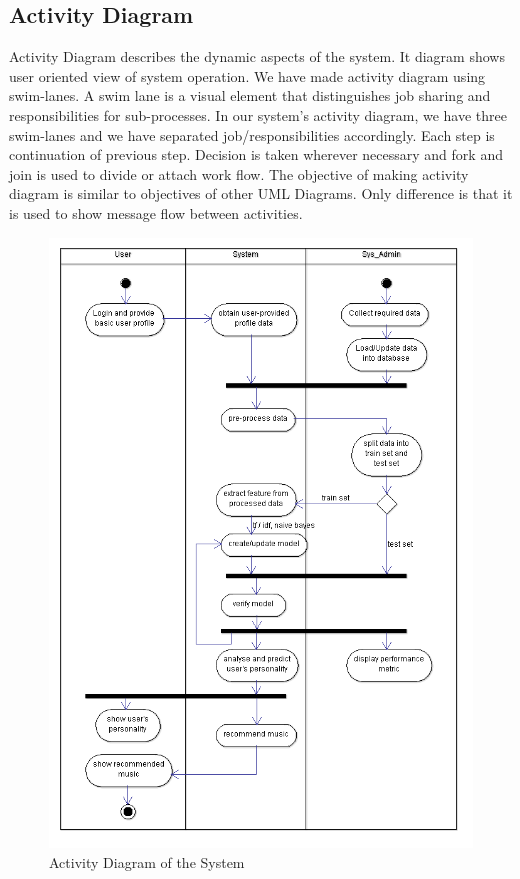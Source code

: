 \subsection{Activity Diagram}
Activity Diagram describes the dynamic aspects of the system. It diagram shows user oriented view of system operation. We have made activity diagram using swim-lanes. A swim lane is a visual element that distinguishes job sharing and responsibilities for sub-processes. In our system's activity diagram, we have three swim-lanes and we have separated job/responsibilities accordingly. Each step is continuation of previous step. Decision is taken wherever necessary and fork and join is used to divide or attach work flow. The objective of making activity diagram is similar to objectives of other UML Diagrams. Only difference is that it is used to show message flow between activities.
\newpage
\begin{figure}[!ht]
\centering
\includegraphics[width = 12 cm]{fig/new/activity.png}
\caption{Activity Diagram of the System}
\label{fig:activity}
\end{figure}

